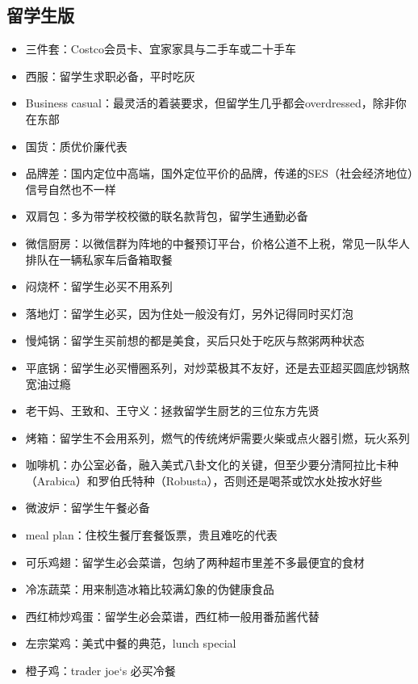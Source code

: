 \documentclass[]{tufte-book}
\providecommand{\tightlist}{%
  \setlength{\itemsep}{0pt}\setlength{\parskip}{0pt}}
\begin{document}
\hypertarget{ux7559ux5b66ux751fux7248}{%
\subsection*{留学生版}\label{ux7559ux5b66ux751fux7248}}

\begin{itemize}
\tightlist
\item
  三件套：Costco会员卡、宜家家具与二手车或二十手车
\item
  西服：留学生求职必备，平时吃灰
\item
  Business casual：最灵活的着装要求，但留学生几乎都会overdressed，除非你在东部
\item
  国货：质优价廉代表
\item
  品牌差：国内定位中高端，国外定位平价的品牌，传递的SES（社会经济地位）信号自然也不一样
\item
  双肩包：多为带学校校徽的联名款背包，留学生通勤必备
\item
  微信厨房：以微信群为阵地的中餐预订平台，价格公道不上税，常见一队华人排队在一辆私家车后备箱取餐
\item
  闷烧杯：留学生必买不用系列
\item
  落地灯：留学生必买，因为住处一般没有灯，另外记得同时买灯泡
\item
  慢炖锅：留学生买前想的都是美食，买后只处于吃灰与熬粥两种状态
\item
  平底锅：留学生必买懵圈系列，对炒菜极其不友好，还是去亚超买圆底炒锅熬宽油过瘾
\item
  老干妈、王致和、王守义：拯救留学生厨艺的三位东方先贤
\item
  烤箱：留学生不会用系列，燃气的传统烤炉需要火柴或点火器引燃，玩火系列
\item
  咖啡机：办公室必备，融入美式八卦文化的关键，但至少要分清阿拉比卡种（Arabica）和罗伯氏特种（Robusta），否则还是喝茶或饮水处按水好些
\item
  微波炉：留学生午餐必备
\item
  meal plan：住校生餐厅套餐饭票，贵且难吃的代表
\item
  可乐鸡翅：留学生必会菜谱，包纳了两种超市里差不多最便宜的食材
\item
  冷冻蔬菜：用来制造冰箱比较满幻象的伪健康食品
\item
  西红柿炒鸡蛋：留学生必会菜谱，西红柿一般用番茄酱代替
\item
  左宗棠鸡：美式中餐的典范，lunch special
\item
  橙子鸡：trader joe`s 必买冷餐

\end{itemize}
\end{document}
